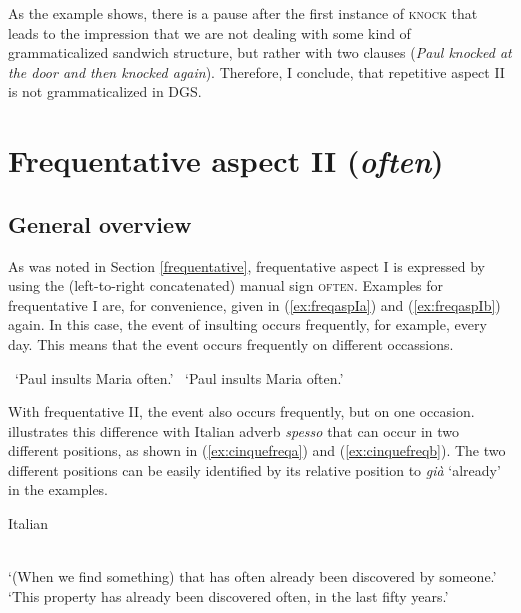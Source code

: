 \noindent As the example shows, there is a pause after the first instance of \textsc{knock} that leads to the impression that we are not dealing with some kind of grammaticalized sandwich structure, but rather with two clauses (\textit{Paul knocked at the door and then knocked again}). Therefore, I conclude, that repetitive aspect II is not grammaticalized in DGS. 




\section{Frequentative aspect II (\textit{often})}\label{frequentatitivetwo}
\subsection{General overview}
As was noted in Section \ref{frequentative}, frequentative aspect I is expressed by using the (left-to-right concatenated) manual sign \textsc{often}. Examples for frequentative I are, for convenience, given in (\ref{ex:freqaspIa}) and (\ref{ex:freqaspIb}) again. In this case, the event of insulting occurs frequently, for example, every day. This means that the event occurs frequently on different occassions. 

\begin{exe}
\ex\begin{xlist} 
\glt \textcolor{white}{*}`Paul insults Maria often.' \label{ex:freqaspIa}
\glt \textcolor{white}{*}`Paul insults Maria often.' \label{ex:freqaspIb}
\end{xlist}
\end{exe} 

\noindent With frequentative II, the event also occurs frequently, but on one occasion. \citet[92]{cinque1999adverbs} illustrates this difference with Italian adverb \textit{spesso} that can occur in two different positions, as shown in (\ref{ex:cinquefreqa}) and (\ref{ex:cinquefreqb}). The two different positions can be easily identified by its relative position to \textit{già} `already' in the examples. 

\begin{exe}
\ex Italian \citep[92]{cinque1999adverbs}\begin{xlist} 
 \\
`(When we find something) that has often already been discovered by someone.' \label{ex:cinquefreqa}
 \\
`This property has already been discovered often, in the last fifty years.' \label{ex:cinquefreqb}
\end{xlist}
\end{exe} 


